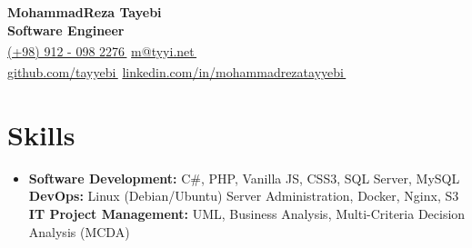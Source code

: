 \documentclass[11pt,a4paper]{article}
\let\orighref\href
\renewcommand{\href}[2]{\orighref{#1}{#2\,{\textsuperscript{\tiny{\textcolor{heritagered}{\faExternalLink}}}}}}
\begin{document}
\graphicspath{ {./img} }


    \textbf{\textcolor{ultramarine}{\Large MohammadReza Tayebi}}
    \\
    \textbf{Software Engineer}
    \\
    \small\href{tel:+989120982276}{(+98) 912 - 098 2276}
    \small\href{mailto:m@tyyi.net}{m@tyyi.net}
    \\
    \small\href{https://github.com/tayyebi}{github.com/tayyebi}
    \small\href{https://www.linkedin.com/in/mohammadrezatayyebi/}{linkedin.com/in/mohammadrezatayyebi}
    \vspace{-20pt}





\section{Skills}
 \begin{itemize}[leftmargin=0.15in, label={}]
    \item {
        \textbf{Software Development:}
        C\#, PHP, Vanilla JS, CSS3, SQL Server, MySQL
        \\
        \textbf{DevOps:}
        Linux (Debian/Ubuntu) Server Administration, Docker, Nginx, S3 
        \\
        \textbf{IT Project Management:}
        {UML},
        {Business Analysis},
        {Multi-Criteria Decision Analysis (MCDA)}
    }
     
 \end{itemize}
\end{document}
